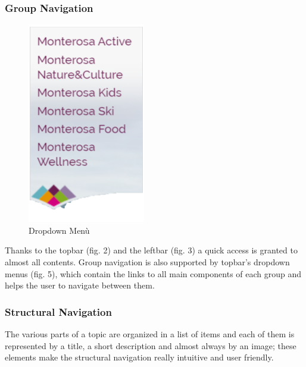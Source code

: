 \subsubsection{Group Navigation}
\begin{figure}
    	\includegraphics[width=0.9\linewidth]{./assets/dropdown-menu.png}
	\caption{Dropdown Menù}
\end{figure} Thanks to the topbar (fig. 2) and the leftbar (fig. 3) a quick access is granted to almost all contents. Group navigation is also supported by topbar's dropdown menus (fig. 5), which contain the links to all main components of each group and helps the user to navigate between them. 

\subsubsection{Structural Navigation}
The various parts of a topic are organized in a list of items and each of them is represented by a title, a short description and almost always by an image; these elements make the structural navigation really intuitive and user friendly.


